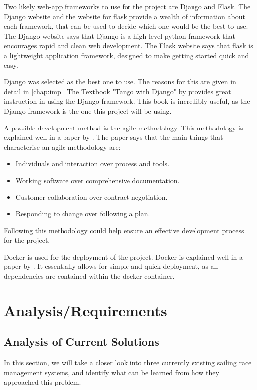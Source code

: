 \documentclass{l4proj}
\begin{document}
Two likely web-app frameworks to use for the project are Django and Flask. The Django website \citep{django} and the website for flask \citep{flask} provide a wealth of information about each framework, that can be used to decide which one would be the best to use. The Django website says that Django is a high-level python framework that encourages rapid and clean web development. The Flask website says that flask is a lightweight application framework, designed to make getting started quick and easy.

Django was selected as the best one to use. The reasons for this are given in detail in \ref{chap:imp}. The Textbook "Tango with Django" by \citet{tango} provides great instruction in using the Django framework. This book is incredibly useful, as the Django framework is the one this project will be using.

A possible development method is the agile methodology. This methodology is explained well in a paper by \citet{agile}. The paper says that the main things that characterise an agile methodology are:
\begin{itemize}
    \item 
    Individuals and interaction over process and tools.
    \item 
    Working software over comprehensive documentation.
    \item 
    Customer collaboration over contract negotiation.
    \item 
    Responding to change over following a plan.
\end{itemize}

Following this methodology could help ensure an effective development process for the project.

Docker is used for the deployment of the project. Docker is explained well in a paper by \citet{docker}. It essentially allows for simple and quick deployment, as all dependencies are contained within the docker container.




\chapter{Analysis/Requirements}\label{chap:A/R}
\section{Analysis of Current Solutions}
In this section, we will take a closer look into three currently existing sailing race management systems, and identify what can be learned from how they approached this problem.
\end{document}
